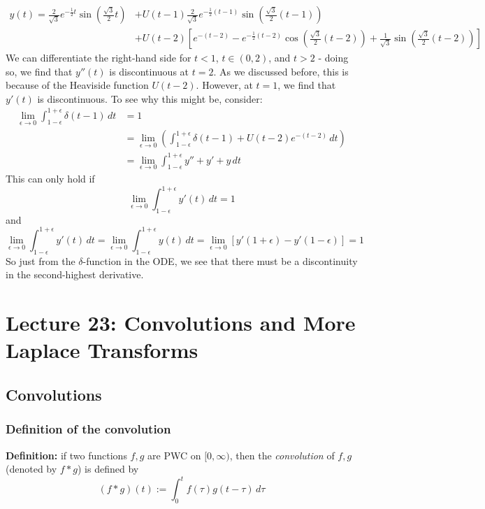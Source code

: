 \documentclass[11pt]{article}
\newcommand{\definition}{\textbf{Definition: }}
\begin{document}
		\begin{align*}
			y(t) = \frac{2}{\sqrt{3}} e^{- \frac{1}{2} t} \sin \left(\frac{\sqrt{3}}{2} t \right) &+ U(t-1) \frac{2}{\sqrt{3}} e^{-\frac{1}{2} (t-1)} \sin \left(\frac{\sqrt{3}}{2} (t-1)\right) \\
			&+ U(t-2) \left[ e^{-(t-2)} -  e^{-\frac{1}{2} (t-2)} \cos \left( \frac{\sqrt{3}}{2} (t-2)\right) + \frac{1}{\sqrt{3}}  \sin \left(\frac{\sqrt{3}}{2} (t-2) \right) \right]
		\end{align*}
	We can differentiate the right-hand side for $t < 1$, $t \in (0, 2)$, and $t > 2$ - doing so, we find that $y''(t)$ is discontinuous at $t=2$. As we discussed before, this is because of the Heaviside function $U(t-2)$. However, at $t=1$, we find that $y'(t)$ is discontinuous. To see why this might be, consider:
		\begin{align*}
			\lim_{\epsilon \to 0} \int_{1 - \epsilon}^{1 + \epsilon} \delta (t-1)\,dt &= 1 \\
				&= \lim_{\epsilon \to 0} \left(\int_{1 - \epsilon}^{1 + \epsilon} \delta (t-1) + U(t-2) e^{-(t-2)} \,dt \right) \\
				&= \lim_{\epsilon \to 0} \int_{1 - \epsilon}^{1 + \epsilon} y'' + y' + y \,dt
		\end{align*}
	This can only hold if
		$$ \lim_{\epsilon \to 0} \int_{1 - \epsilon}^{1 + \epsilon} y' (t) \, dt = 1 $$
	and
		$$ \lim_{\epsilon \to 0} \int_{1 - \epsilon}^{1 + \epsilon} y'(t) \,dt = \lim_{\epsilon \to 0} \int_{1 - \epsilon}^{1 + \epsilon} y(t)\,dt = \lim_{\epsilon \to 0} [y'(1 + \epsilon) - y'(1 - \epsilon)] = 1 $$
	So just from the $\delta$-function in the ODE, we see that there must be a discontinuity in the second-highest derivative.


\section{Lecture 23: Convolutions and More Laplace Transforms}
\subsection{Convolutions}
\subsubsection{Definition of the convolution}
	\definition if two functions $f,g$ are PWC on $[0, \infty)$, then the \emph{convolution} of $f,g$ (denoted by $f * g$) is defined by
		$$ (f*g) (t) := \int_0^t f(\tau) g (t-\tau) \,d\tau $$
\end{document}
